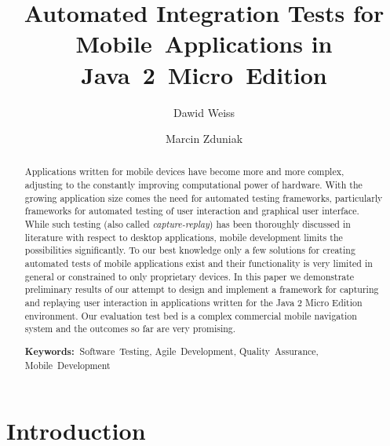 \documentclass{llncs}
\begin{document}
\mainmatter

\title{Automated Integration Tests for Mobile~Applications in Java~2~Micro~Edition}

\author{Dawid Weiss \and Marcin Zduniak
}

\maketitle              %

\begin{abstract} 
Applications written for mobile devices have become more and more complex, adjusting to the
constantly improving computational power of hardware. With the growing application size comes the
need for automated testing frameworks, particularly frameworks for automated testing of user
interaction and graphical user interface. While such testing (also called
\emph{capture-replay}) has been thoroughly discussed in literature with respect to desktop
applications, mobile development limits the possibilities significantly. To our best knowledge only
a few solutions for creating automated tests of mobile applications exist and their functionality
is very limited in general or constrained to only proprietary devices. 
In this paper we demonstrate preliminary results of our attempt to design and implement a
framework for capturing and replaying user interaction in applications written for the Java 2 Micro
Edition environment. Our evaluation test bed is a complex commercial mobile navigation system
and the outcomes so far are very promising.

\medskip\noindent\textbf{Keywords:~}Software~Testing, Agile~Development, Quality~Assurance, Mobile~Development 
\end{abstract}


\section{Introduction} %
\end{document}
